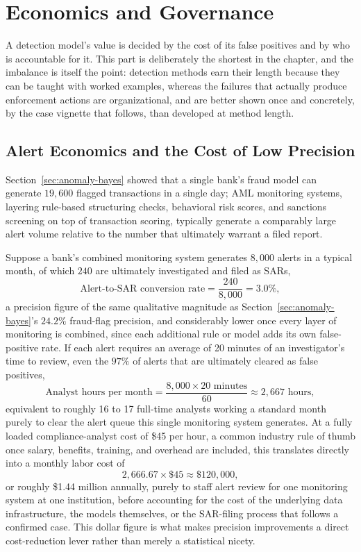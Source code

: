 \documentclass[../ai_in_finance]{subfiles}
\begin{document}
\section{Economics and Governance}

A detection model's value is decided by the cost of its false positives and by who is accountable for it. This part is deliberately the shortest in the chapter, and the imbalance is itself the point: detection methods earn their length because they can be taught with worked examples, whereas the failures that actually produce enforcement actions are organizational, and are better shown once and concretely, by the case vignette that follows, than developed at method length.

\subsection{Alert Economics and the Cost of Low Precision}
\label{sec:alert-economics}

Section~\ref{sec:anomaly-bayes} showed that a single bank's fraud model can generate $19{,}600$ flagged transactions in a single day; AML monitoring systems, layering rule-based structuring checks, behavioral risk scores, and sanctions screening on top of transaction scoring, typically generate a comparably large alert volume relative to the number that ultimately warrant a filed report.

Suppose a bank's combined monitoring system generates $8{,}000$ alerts in a typical month, of which $240$ are ultimately investigated and filed as SARs,
\begin{equation*}
\text{Alert-to-SAR conversion rate} = \frac{240}{8{,}000} = 3.0\%,
\end{equation*}
a precision figure of the same qualitative magnitude as Section~\ref{sec:anomaly-bayes}'s $24.2\%$ fraud-flag precision, and considerably lower once every layer of monitoring is combined, since each additional rule or model adds its own false-positive rate. If each alert requires an average of 20 minutes of an investigator's time to review, even the $97\%$ of alerts that are ultimately cleared as false positives,
\begin{equation*}
\text{Analyst hours per month} = \frac{8{,}000 \times 20 \text{ minutes}}{60} \approx 2{,}667 \text{ hours},
\end{equation*}
equivalent to roughly 16 to 17 full-time analysts working a standard month purely to clear the alert queue this single monitoring system generates. At a fully loaded compliance-analyst cost of \$45 per hour, a common industry rule of thumb once salary, benefits, training, and overhead are included, this translates directly into a monthly labor cost of
\begin{equation*}
2{,}666.67 \times \$45 \approx \$120{,}000,
\end{equation*}
or roughly \$1.44 million annually, purely to staff alert review for one monitoring system at one institution, before accounting for the cost of the underlying data infrastructure, the models themselves, or the SAR-filing process that follows a confirmed case. This dollar figure is what makes precision improvements a direct cost-reduction lever rather than merely a statistical nicety.
\end{document}

